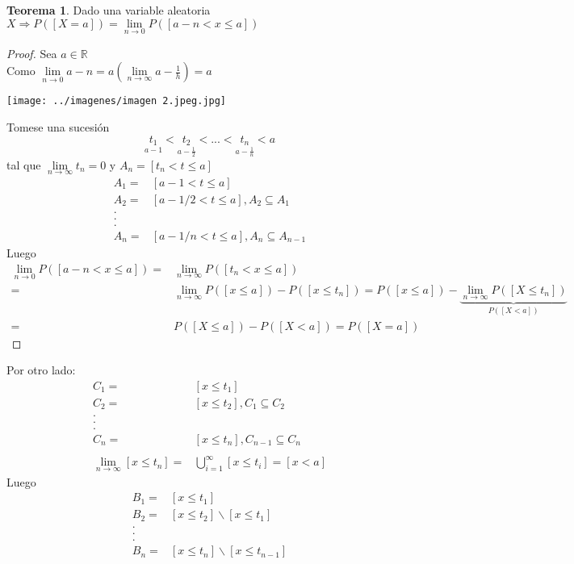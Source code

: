 \documentclass[12pt,letterpaper]{article}
\theoremstyle{definition}
\newtheorem{theorem}{Teorema}[section]
\begin{document}
\begin{theorem}
	Dado una variable aleatoria $X\Rightarrow P([X=a])=\lim\limits_{n\to 0} P([a-n<x\leq a])$
\end{theorem}
\begin{proof}
	Sea $a\in\mathbb{R}$\\
	Como $\lim\limits_{n\to 0} a-n=a\left( \lim\limits_{n\to \infty} a-\frac{1}{h}\right)=a$
	\begin{center}
\texttt{[image: ../imagenes/imagen 2.jpeg.jpg]} 
\end{center}
Tomese una sucesión
\[\underset{a-1}{t_1}<\underset{a-\frac{1}{2}}{t_2}<...<\underset{a-\frac{1}{n}}{t_n}<a\]
tal que $\lim\limits_{n\to \infty}t_n=0$ y $A_n=[t_n<t\leq a]$
\[
\begin{array}{rl}
	A_1=& [a-1<t\leq a]\\
	A_2=& [a-1/2<t\leq a], A_2\subseteq A_1\\
	.\\
	.\\
	.\\
	A_n=& [a-1/n<t\leq a], A_n\subseteq A_{n-1}
	
\end{array}
\]
Luego
\[
\begin{array}{rl}
	\lim\limits_{n\to 0} P([a-n<x\leq a])=& \lim\limits_{n\to \infty} P([t_n<x\leq a])\\
	=& \lim\limits_{n\to \infty} P([x\leq a])- P([x\leq t_n])=P([x\leq a])-\underbrace{\lim\limits_{n\to \infty} P([X\leq t_n])}_{P([X < a])}\\
	=& P([X\leq a])-P([X < a])= P([X=a])
\end{array}
\]
\end{proof}
Por otro lado:
\[
\begin{array}{rl}
	C_1=& [x\leq t_1]\\
	C_2=& [x\leq t_2], C_1\subseteq C_2\\
	.\\
	.\\
	.\\
	C_n=& [x\leq t_n], C_{n-1}\subseteq C_n\\
	\\
	\lim\limits_{n\to \infty} [x\leq t_n]=& \bigcup^{\infty}_{i=1}[x\leq t_i]=[x<a]
\end{array}
\]
Luego
\[
\begin{array}{rl}
	B_1=& [x\leq t_1]\\
	B_2=& [x\leq t_2]\smallsetminus [x\leq t_1]\\
	.\\
	.\\
	.\\
	B_n=& [x\leq t_n]\smallsetminus [x\leq t_{n-1}]
\end{array}
\]
\end{document}
